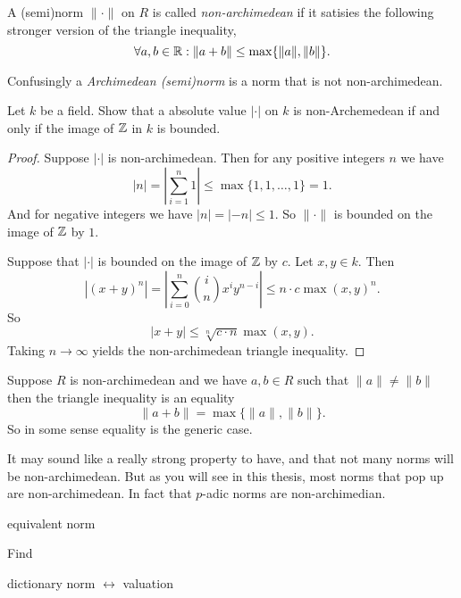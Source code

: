 \begin{definition}
	A (semi)norm $\|\cdot \|$ on $R$ is called \emph{non-archimedean} if it satisies the following stronger version of the triangle inequality, \[
	\forall a, b \in \mathbb{R}: \|a + b\| \le \max \{\|a\|, \|b\|\} 
	.\] 

	Confusingly a \emph{Archimedean (semi)norm} is a norm that is not non-archimedean.
\end{definition}

\begin{exercise}
	Let $k$ be a field.
	Show that a absolute value  $|\cdot |$ on $k$ is non-Archemedean if and only if the image of $\mathbb{Z}$ in $k$ is bounded. 
\end{exercise}
\begin{proof}
	Suppose $|\cdot |$ is non-archimedean. Then for any positive integers $n$ we have \[
	|n| = \left|\sum_{i = 1}^{n} 1 \right| \le \max \{1, 1, \ldots, 1\}  = 1
	.\] 
	And for negative integers we have $|n| = |-n| \le 1$. So $\|\cdot \|$ is bounded on the image of $\mathbb{Z}$ by $1$. 


	Suppose that $|\cdot |$ is bounded on the image of $\mathbb{Z}$ by $c$. 
	Let $x, y \in k$. Then \[
		|(x + y)^{n}| = \left| \sum_{i = 0}^{n} \binom{i}{n} x ^{i} y ^{n-i}\right| \le n\cdot c \max(x, y)^{n}
	.\] 
	So \[
		|x + y| \le \sqrt[n]{c\cdot n}  \max(x, y)
	.\] 
	Taking $n \to \infty$ yields the non-archimedean triangle inequality. 
\end{proof}

\begin{remark}
	Suppose $R$ is non-archimedean and we have $a, b \in R$ such that $\|a\| \ne \|b\|$ then the triangle inequality is an equality \[
	\|a + b\| = \max \{\|a\|, \|b\|\} 
	.\] 
	So in some sense equality is the generic case. 
\end{remark}
It may sound like a really strong property to have, and that not many norms will be non-archimedean. 
But as you will see in this thesis, most norms that pop up are non-archimedean. 
In fact that $p$-adic norms are non-archimedian. 


\begin{definition}
	equivalent norm
\end{definition}

Find
\begin{remark}
	dictionary norm $\leftrightarrow$ valuation
\end{remark} 


